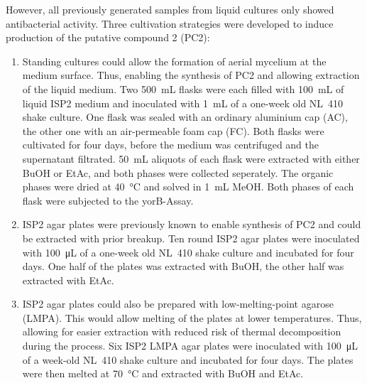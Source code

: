    
    
    However, all previously generated samples from liquid cultures only showed antibacterial activity.
    Three cultivation strategies were developed to induce production of the putative compound 2 (PC2):

    \begin{enumerate}
        \item
	        Standing cultures could allow the formation of aerial mycelium at the medium surface.
	        Thus, enabling the synthesis of PC2 and allowing extraction of the liquid medium.
	        Two \SI{500}{\milli\liter} flasks were each filled with \SI{100}{\milli\liter} of liquid ISP2 medium and inoculated with \SI{1}{\milli\liter} of a one-week old NL~410 shake culture.
	        One flask was sealed with an ordinary aluminium cap (AC), the other one with an air-permeable foam cap (FC).
	        Both flasks were cultivated for four days, before the medium was centrifuged and the supernatant filtrated.
	        \SI{50}{\milli\liter} aliquots of each flask were extracted with either BuOH or EtAc, and both phases were collected seperately.
	        The organic phases were dried at \SI{40}{\celsius} and solved in \SI{1}{\milli\liter} MeOH.
	        Both phases of each flask were subjected to the yorB-Assay.
        \item
	        ISP2 agar plates were previously known to enable synthesis of PC2 and could be extracted with prior breakup.
	        Ten round ISP2 agar plates were inoculated with \SI{100}{\micro\liter} of a one-week old NL~410 shake culture and incubated for four days.
	        One half of the plates was extracted with BuOH, the other half was extracted with EtAc.
        \item
	        ISP2 agar plates could also be prepared with low-melting-point agarose (LMPA).
	        This would allow melting of the plates at lower temperatures.
	        Thus, allowing for easier extraction with reduced risk of thermal decomposition during the process.
	        Six ISP2 LMPA agar plates were inoculated with \SI{100}{\micro\liter} of a week-old NL~410 shake culture and incubated for four days.
	        The plates were then melted at \SI{70}{\celsius} and extracted with BuOH and EtAc.
    \end{enumerate}

